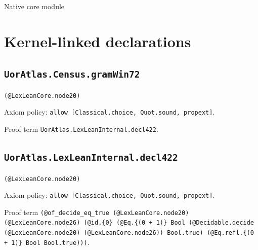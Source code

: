 \documentclass[11pt]{article}
\begin{document}
\begin{center}{\LARGE Native core module}\end{center}
\section*{Kernel-linked declarations}
\subsection*{\texttt{UorAtlas.Census.gramWin72}}
\noindent\texttt{(@LexLeanCore.node20)}\par
\noindent Axiom policy: \texttt{allow [Classical.choice, Quot.sound, propext]}.\par
\noindent Proof term \texttt{UorAtlas.LexLeanInternal.decl422}.\par
\subsection*{\texttt{UorAtlas.LexLeanInternal.decl422}}
\noindent\texttt{(@LexLeanCore.node20)}\par
\noindent Axiom policy: \texttt{allow [Classical.choice, Quot.sound, propext]}.\par
\noindent Proof term \texttt{(@of\_decide\_eq\_true (@LexLeanCore.node20) (@LexLeanCore.node26) (@id.\{0\} (@Eq.\{(0 + 1)\} Bool (@Decidable.decide (@LexLeanCore.node20) (@LexLeanCore.node26)) Bool.true) (@Eq.refl.\{(0 + 1)\} Bool Bool.true)))}.\par
\end{document}
